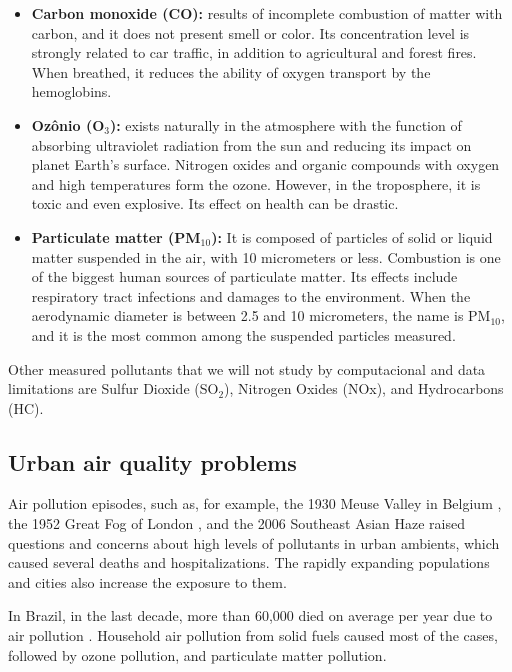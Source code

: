 \begin{itemize}
    \item \textbf{Carbon monoxide (CO):} results of incomplete combustion
    of matter with carbon, and it does not present smell or color. Its
    concentration level is strongly related to car traffic, in addition to
    agricultural and forest fires. When breathed, it reduces the ability of
    oxygen transport by the hemoglobins.  

    \item \textbf{Ozônio (O$_3$):} exists naturally in the atmosphere with the function of absorbing ultraviolet radiation from the sun and reducing its impact on planet Earth's surface. Nitrogen oxides and organic compounds with oxygen and high temperatures form the ozone. However, in the troposphere, it is toxic and even explosive. Its effect on health can be drastic. 

    \item \textbf{Particulate matter (PM$_{10}$):} It is composed of particles of solid or liquid matter suspended in the air, with 10 micrometers or less. Combustion is one of the biggest human sources of particulate matter. Its effects include respiratory tract infections and damages to the environment. When the aerodynamic diameter is between 2.5 and 10 micrometers, the name is PM$_{10}$, and it is the most common among the suspended particles measured.

\end{itemize}

Other measured pollutants that we will not study by computacional and data
limitations are Sulfur Dioxide (SO$_2$), Nitrogen Oxides (NOx), and Hydrocarbons (HC).

\subsection{Urban air quality problems}

Air pollution episodes, such as, for example, the 1930 Meuse Valley in Belgium
\cite{nemery2001}, the 1952 Great Fog of London
\cite{polivka2018}, and the 2006 Southeast Asian Haze \cite{jones2006} raised
questions and concerns about high levels of pollutants in urban ambients,
which caused several deaths and hospitalizations. The rapidly expanding
populations and cities also increase the exposure to them.

In Brazil, in the last decade, more than 60,000 died on average per year due
to air pollution \cite{data-deaths-air-pollution}. Household air pollution
from solid fuels caused most of the cases, followed by ozone pollution, and
particulate matter pollution. 

